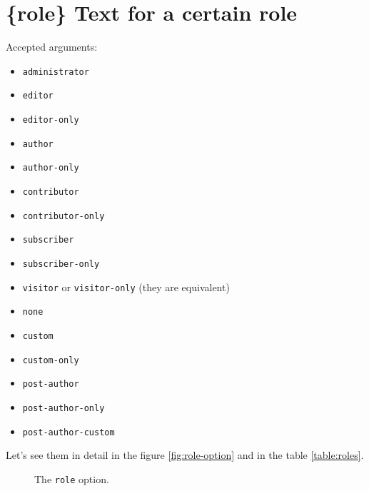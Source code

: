 \section{\{role\} Text for a certain role}

Accepted arguments:

\begin{itemize}
 \item \verb+administrator+
 \item \verb+editor+
 \item \verb+editor-only+
 \item \verb+author+
 \item \verb+author-only+
 \item \verb+contributor+
 \item \verb+contributor-only+
 \item \verb+subscriber+
 \item \verb+subscriber-only+
 \item \verb+visitor+ or \verb+visitor-only+ (they are equivalent)
 \item \verb+none+
 \item \verb+custom+
 \item \verb+custom-only+
 \item \verb+post-author+
 \item \verb+post-author-only+
 \item \verb+post-author-custom+
\end{itemize}

Let's see them in detail in the figure \vref{fig:role-option} and in the table \vref{table:roles}.

\begin{figure}[]
	\centering
	\caption{The \texttt{role} option.}
  \label{fig:role-option}
\end{figure}

